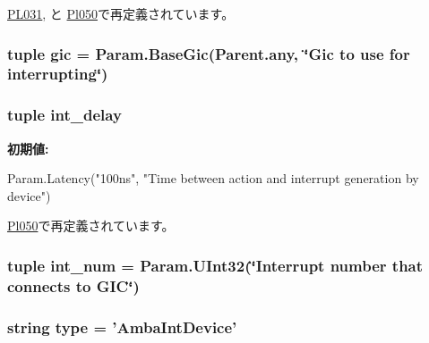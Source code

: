 \hyperlink{classRealView_1_1PL031_a17da7064bc5c518791f0c891eff05fda}{PL031}, と \hyperlink{classRealView_1_1Pl050_a17da7064bc5c518791f0c891eff05fda}{Pl050}で再定義されています。\hypertarget{classRealView_1_1AmbaIntDevice_a40243beb62d217c3a9e35801ae739fd0}{
\subsubsection[{gic}]{\setlength{\rightskip}{0pt plus 5cm}tuple {\bf gic} = Param.BaseGic(Parent.any, \char`\"{}Gic to use for interrupting\char`\"{})}}
\label{classRealView_1_1AmbaIntDevice_a40243beb62d217c3a9e35801ae739fd0}
\hypertarget{classRealView_1_1AmbaIntDevice_a849551e71f91ca939d22d4c083f4c731}{
\subsubsection[{int\_\-delay}]{\setlength{\rightskip}{0pt plus 5cm}tuple {\bf int\_\-delay}}}
\label{classRealView_1_1AmbaIntDevice_a849551e71f91ca939d22d4c083f4c731}
{\bfseries 初期値:}
\begin{DoxyCode}
Param.Latency("100ns",
            "Time between action and interrupt generation by device")
\end{DoxyCode}


\hyperlink{classRealView_1_1Pl050_a143e0c2b2724ac7fcad9543c09b949ef}{Pl050}で再定義されています。\hypertarget{classRealView_1_1AmbaIntDevice_a65fded6db751c1b9aa7168b29056e819}{
\subsubsection[{int\_\-num}]{\setlength{\rightskip}{0pt plus 5cm}tuple {\bf int\_\-num} = Param.UInt32(\char`\"{}Interrupt number that connects to GIC\char`\"{})}}
\label{classRealView_1_1AmbaIntDevice_a65fded6db751c1b9aa7168b29056e819}
\hypertarget{classRealView_1_1AmbaIntDevice_acce15679d830831b0bbe8ebc2a60b2ca}{
\subsubsection[{type}]{\setlength{\rightskip}{0pt plus 5cm}string {\bf type} = '{\bf AmbaIntDevice}'}}
\label{classRealView_1_1AmbaIntDevice_acce15679d830831b0bbe8ebc2a60b2ca}


